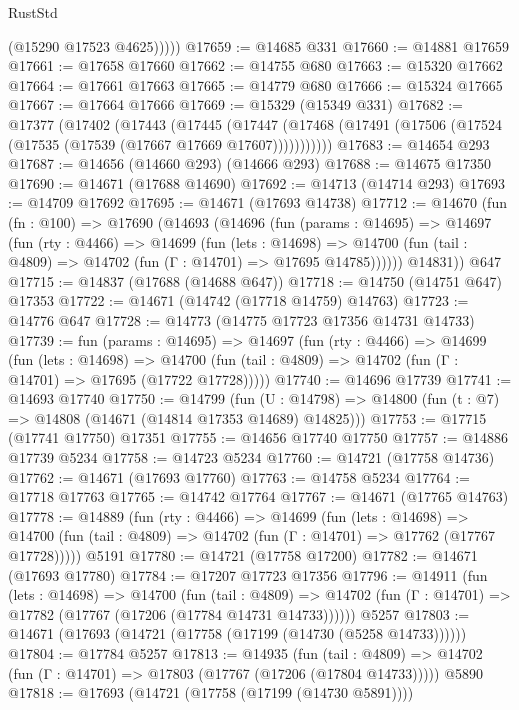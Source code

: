 \begin{lexlean}{RustStd}
\begin{coremodule}
            (@15290 @17523 @4625)))))
@17659 := @14685 @331
@17660 := @14881 @17659
@17661 := @17658 @17660
@17662 := @14755 @680
@17663 := @15320 @17662
@17664 := @17661 @17663
@17665 := @14779 @680
@17666 := @15324 @17665
@17667 := @17664 @17666
@17669 := @15329 (@15349 @331)
@17682 := @17377
    (@17402
      (@17443
        (@17445
          (@17447 (@17468 (@17491 (@17506 (@17524 (@17535 (@17539 (@17667 @17669 @17607)))))))))))
@17683 := @14654 @293
@17687 := @14656 (@14660 @293) (@14666 @293)
@17688 := @14675 @17350
@17690 := @14671 (@17688 @14690)
@17692 := @14713 (@14714 @293)
@17693 := @14709 @17692
@17695 := @14671 (@17693 @14738)
@17712 := @14670
    (fun (fn : @100) =>
    @17690
      (@14693
        (@14696
          (fun (params : @14695) =>
          @14697
            (fun (rty : @4466) =>
            @14699
              (fun (lets : @14698) =>
              @14700 (fun (tail : @4809) => @14702 (fun (Γ : @14701) => @17695 @14785))))))
        @14831))
    @647
@17715 := @14837 (@17688 (@14688 @647))
@17718 := @14750 (@14751 @647) @17353
@17722 := @14671 (@14742 (@17718 @14759) @14763)
@17723 := @14776 @647
@17728 := @14773 (@14775 @17723 @17356 @14731 @14733)
@17739 := fun (params : @14695) =>
  @14697
    (fun (rty : @4466) =>
    @14699
      (fun (lets : @14698) =>
      @14700 (fun (tail : @4809) => @14702 (fun (Γ : @14701) => @17695 (@17722 @17728)))))
@17740 := @14696 @17739
@17741 := @14693 @17740
@17750 := @14799
    (fun (U : @14798) => @14800 (fun (t : @7) => @14808 (@14671 (@14814 @17353 @14689) @14825)))
@17753 := @17715 (@17741 @17750) @17351
@17755 := @14656 @17740 @17750
@17757 := @14886 @17739 @5234
@17758 := @14723 @5234
@17760 := @14721 (@17758 @14736)
@17762 := @14671 (@17693 @17760)
@17763 := @14758 @5234
@17764 := @17718 @17763
@17765 := @14742 @17764
@17767 := @14671 (@17765 @14763)
@17778 := @14889
    (fun (rty : @4466) =>
    @14699
      (fun (lets : @14698) =>
      @14700 (fun (tail : @4809) => @14702 (fun (Γ : @14701) => @17762 (@17767 @17728)))))
    @5191
@17780 := @14721 (@17758 @17200)
@17782 := @14671 (@17693 @17780)
@17784 := @17207 @17723 @17356
@17796 := @14911
    (fun (lets : @14698) =>
    @14700
      (fun (tail : @4809) =>
      @14702 (fun (Γ : @14701) => @17782 (@17767 (@17206 (@17784 @14731 @14733))))))
    @5257
@17803 := @14671 (@17693 (@14721 (@17758 (@17199 (@14730 (@5258 @14733))))))
@17804 := @17784 @5257
@17813 := @14935
    (fun (tail : @4809) => @14702 (fun (Γ : @14701) => @17803 (@17767 (@17206 (@17804 @14733)))))
    @5890
@17818 := @17693 (@14721 (@17758 (@17199 (@14730 @5891))))

\end{coremodule}
\end{lexlean}
